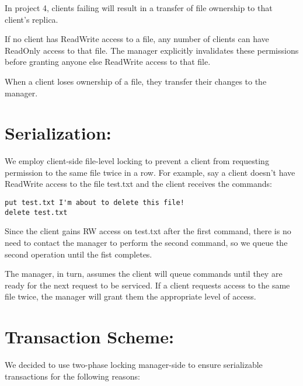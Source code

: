 \documentclass[11pt]{article}
\begin{document}
In project 4, clients failing will result in a transfer of file ownership to that client's replica. 

If no client has ReadWrite access to a file, any number of clients can have ReadOnly access to that file. The manager explicitly invalidates these permissions before granting anyone else ReadWrite access to that file.

When a client loses ownership of a file, they transfer their changes to the manager. 

\section{Serialization:} 

We employ client-side file-level locking to prevent a client from requesting permission to the same file twice in a row.
For example, say a client doesn't have ReadWrite access to the file test.txt and the client receives the commands:

\begin{verbatim}
put test.txt I'm about to delete this file!
delete test.txt
\end{verbatim}

Since the client gains RW access on test.txt after the first command, there is no need to contact the manager to perform the second command, so we queue the second operation until the fist completes.

The manager, in turn, assumes the client will queue commands until they are ready for the next request to be serviced. 
If a client requests access to the same file twice, the manager will grant them the appropriate level of access. 

\section{Transaction Scheme:} 

We decided to use two-phase locking manager-side to ensure serializable transactions for the following reasons:
\end{document}
